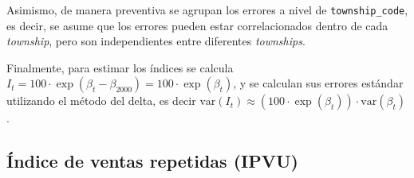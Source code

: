 \documentclass[conference]{IEEEtran}
\begin{document}
Asimismo, de manera preventiva se agrupan los errores a nivel de \texttt{township\_code}, es decir, se asume que los errores pueden estar correlacionados 
dentro de cada \textit{township}, pero son independientes entre diferentes \textit{townships}.

Finalmente, para estimar los índices se calcula $I_t = 100 \cdot \exp(\beta_t - \beta_{2000}) = 100 \cdot \exp(\beta_t)$, y se calculan sus errores estándar utilizando el método del delta, 
es decir $\text{var}(I_t) \approx (100 \cdot \exp(\beta_t)) \cdot \text{var}(\beta_t)$.


\subsection{Índice de ventas repetidas (IPVU)}
\end{document}
